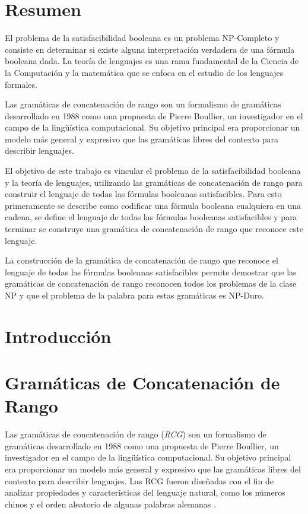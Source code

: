 \documentclass{article}
\begin{document}
\section{Resumen}

El problema de la satisfacibilidad booleana es un problema NP-Completo y consiste en determinar si existe
alguna interpretación verdadera de una fórmula booleana dada. La teoría de lenguajes es una rama fundamental de la Ciencia de la Computación y la matemática que se enfoca
en el estudio de los lenguajes formales.

Las gramáticas de concatenación de rango son un formalismo de gramáticas desarrollado
en 1988 como una propuesta de Pierre Boullier, un investigador en el campo de la lingüística computacional. Su objetivo principal era proporcionar un modelo más general y expresivo que las gramáticas libres del contexto para describir lenguajes.

El objetivo de este trabajo es vincular el problema de la satisfacibilidad
booleana y la teoría de lenguajes, utilizando las gramáticas de concatenación de rango
para construir el lenguaje de todas las fórmulas booleanas satisfacibles.
Para esto primeramente se describe como codificar una fórmula booleana cualquiera en una cadena, se define el lenguaje
de todas las fórmulas booleanas satisfacibles y para terminar se construye una gramática de concatenación de rango
que reconoce este lenguaje.

La construcción de la gramática de concatenación de rango que reconoce el lenguaje de todas
las fórmulas booleanas satisfacibles permite demostrar que las gramáticas de concatenación de rango reconocen
todos los problemas de la clase NP y que el problema de la palabra para estas gramáticas es NP-Duro.

\section{Introducción}


\section{Gramáticas de Concatenación de Rango}
\label{sec:RCG}

Las gramáticas de concatenación de rango (\textit{RCG}) \cite{mainRCGBib} son un formalismo de gramáticas desarrollado
en 1988 como una propuesta de Pierre Boullier, un investigador en el campo de la lingüística computacional. Su objetivo
principal era proporcionar un modelo más general y expresivo que las gramáticas libres del contexto para describir
lenguajes.  Las RCG fueron diseñadas con el fin de analizar propiedades y características del lenguaje natural, como los números
chinos y el orden aleatorio de algunas palabras alemanas \cite{boullier1999chinese}.
\end{document}
